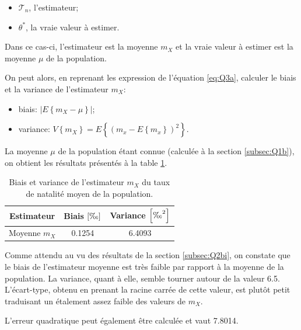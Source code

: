 \documentclass[a4paper, 12pt]{article}
\newcommand{\T}{\mathcal{T}}
\begin{document}
	\begin{itemize}
	    \item \(\T_n\), l'estimateur;
	    \item \(\theta^*\), la vraie valeur à estimer.
	\end{itemize}
	
	Dans ce cas-ci, l'estimateur est la moyenne \(m_X\) et la vraie valeur à estimer est la moyenne \(\mu\) de la population.\par
	
	On peut alors, en reprenant les expression de l'équation \eqref{eq:Q3a}, calculer le biais et la variance de l'estimateur \(m_X\):
	
	\begin{itemize}
	    \item biais: \(\left |E\left\{m_X-\mu\right\}\right |\);
	    \item variance: \(V\left\{m_X\right\} = E\left \{\left (m_x - E\left \{m_x\right\}\right )^2\right \}\).
	\end{itemize}
	
	La moyenne \(\mu\) de la population étant connue (calculée à la section \ref{subsec:Q1b}), on obtient les résultats présentés à la table \ref{tab:Q3a}.\par
	
	\begin{table}[!ht]
	    \centering
	    \begin{tabular}{|c|c|c|}
	        \hline
	        \textbf{Estimateur} & \textbf{Biais} \(\left [\text{\textperthousand} \right ]\) & \textbf{Variance} \(\left [\text{\textperthousand}^2 \right ]\)\\ \hline
	        \hline
	        Moyenne \(m_X\) & \num{0.1254} & \num{6.4093}\\ \hline
	    \end{tabular}
	    \caption{Biais et variance de l'estimateur \(m_X\) du taux de natalité moyen de la population.}
	    \label{tab:Q3a}
	\end{table}
	
	Comme attendu au vu des résultats de la section \ref{subsec:Q2bi}, on constate que le biais de l'estimateur moyenne est très faible par rapport à la moyenne de la population. La variance, quant à elle, semble tourner autour de la valeur \num{6.5}. L'écart-type, obtenu en prenant la racine carrée de cette valeur, est plutôt petit traduisant un étalement assez faible des valeurs de \(m_X\).\par
	
	L'erreur quadratique peut également être calculée et vaut \num{7.8014}.
	
\end{document}
